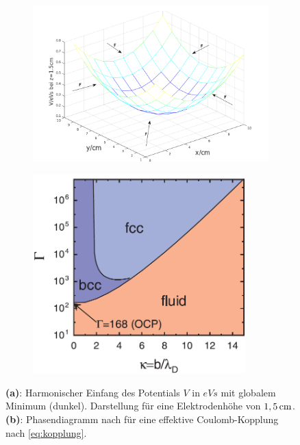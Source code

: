 \documentclass[numbers=noenddot,a4paper,notitlepage,twoside,BCOR15mm]{scrartcl}
\newcommand{\fett}[1]{\textbf{#1}}
\begin{document}
			\begin{figure}
				\centering
				\begin{subfigure}[t]{0.48\textwidth}
					\centering
					\includegraphics[width=1.1\textwidth,height=0.3\textheight]{figs/einfangpotnu.png}
					\caption{}
					\label{img:potential}
				\end{subfigure}
				\begin{subfigure}[t]{0.48\textwidth}
					\centering
					\includegraphics[width=0.9\textwidth,height=0.3\textheight]{figs/gammaphasetransmelzer.png}
					\caption{}
					\label{img:gamma}
				\end{subfigure}
				\caption{\fett{(a)}: Harmonischer Einfang des Potentials $V$ in $\unit{eVs}$ mit globalem Minimum (dunkel). Darstellung für eine Elektrodenhöhe  von $\unit[1,5]{cm}$. \fett{(b)}: Phasendiagramm nach \cite{Melzer12} für eine effektive Coulomb-Kopplung nach \autoref{eq:kopplung}.}
			\end{figure}
\end{document}
